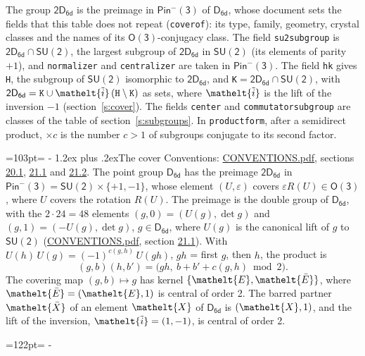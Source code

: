 \documentclass[10pt,a4paper]{article}
\makeatletter
\renewcommand\section{\@startsection{section}{1}{\z@}{-3ex plus -1ex minus -.2ex}%
  {1.2ex plus .2ex}{\normalfont\large\sffamily\bfseries\color{parttitle}}}
\newcommand{\needspace}[1]{\par\penalty-100\begingroup\dimen0=#1\relax\dimen2=\pagegoal
  \advance\dimen2-\pagetotal\ifdim\dimen0>\dimen2\relax\ifdim\dimen2>0pt\vfil\break\fi\fi
  \endgroup}
\numberwithin{equation}{section}
\newcommand{\eltfont}[1]{{\let\sigma\eltsigma\mathelt{#1}}}
\newcommand{\grp}[1]{\mathsf{#1}}
\newcommand{\elt}[1]{\eltfont{#1}}
\newcommand{\dirprod}{\times}
\newcommand{\barred}[1]{\bar{#1}}
\newcommand{\lift}[1]{\tilde{#1}}
\makeatother
\begin{document}
\leavevmode\label{n:element.inversion}\label{n:group.preimage}The group $\grp{2D_{6d}}$ is the preimage in $\grp{Pin^{-}(3)}$ of \href{../../../rotation/data/pdf/D6d.pdf}{$\grp{D_{6d}}$}, whose document sets the fields that this table does not repeat (\texttt{coverof}): its type, family, geometry, crystal classes and the names of its \href{../../../rotation/data/pdf/O3.pdf}{$\grp{O(3)}$}-conjugacy class. The field \texttt{su2subgroup} is $\grp{2D_{6d}} \cap \grp{SU(2)}$, the largest subgroup of $\grp{2D_{6d}}$ in $\grp{SU(2)}$ (its elements of parity $+1$), and \texttt{normalizer} and \texttt{centralizer} are taken in $\grp{Pin^{-}(3)}$. The field \texttt{hk} gives \texttt{H}, the subgroup of $\grp{SU(2)}$ isomorphic to $\grp{2D_{6d}}$, and \texttt{K}${} = \grp{2D_{6d}} \cap \grp{SU(2)}$, with $\grp{2D_{6d}} = \texttt{K} \cup \elt{\lift{i}}\,(\texttt{H} \setminus \texttt{K})$ as sets, where $\elt{\lift{i}}$ is the lift of the inversion $-1$ (section~\ref{s:cover}). The fields \texttt{center} and \texttt{commutatorsubgroup} are classes of the table of section~\ref{s:subgroups}.
\leavevmode\label{n:index.conjugates.c}In \texttt{productform}, after a semidirect product, ${\times}c$ is the number $c > 1$ of subgroups conjugate to its second factor.
\needspace{103pt}
\section{The cover}\label{s:cover}
Conventions: \href{../../CONVENTIONS.pdf}{CONVENTIONS.pdf}, sections \href{../../CONVENTIONS.pdf\#conv.20.1}{20.1}, \href{../../CONVENTIONS.pdf\#conv.21.1}{21.1} and \href{../../CONVENTIONS.pdf\#conv.21.2}{21.2}.
\leavevmode\label{n:group.pin.minus}\label{n:group.su2}\label{n:local.pin.sign}\label{n:matrix.covered}\label{n:matrix.lift.su2}\label{n:index.bar}The point group $\grp{D_{6d}}$ has the preimage $\grp{2D_{6d}}$ in $\grp{Pin^{-}(3)} = \grp{SU(2)} \dirprod \{+1, -1\}$, whose element $(U, \varepsilon)$ covers $\varepsilon R(U) \in \grp{O(3)}$, where $U$ covers the rotation $R(U)$. The preimage is the double group of $\grp{D_{6d}}$, with the $2 \cdot 24 = 48$ elements $(g, 0) = (U(g), \det g)$ and $(g, 1) = (-U(g), \det g)$, $g \in \grp{D_{6d}}$, where $U(g)$ is the canonical lift of $g$ to $\grp{SU(2)}$ (\href{../../CONVENTIONS.pdf}{CONVENTIONS.pdf}, section \href{../../CONVENTIONS.pdf\#conv.21.1}{21.1}). \label{n:function.cocycle}With $U(h)\,U(g) = (-1)^{c(g,h)}\,U(gh)$, $gh$ = first $g$, then $h$, the product is
\begin{equation}\label{e:product}(g, b)(h, b') = \bigl(gh,\ b + b' + c(g, h) \bmod 2\bigr).\end{equation}
\leavevmode\label{n:mark.bar}The covering map $(g, b) \mapsto g$ has kernel $\{\elt{E}, \elt{\barred{E}}\}$, where $\elt{\barred{E}} = (\elt{E}, 1)$ is central of order 2. \label{n:element.named}\label{n:mark.lift}The barred partner $\elt{\barred{X}}$ of an element $\elt{X}$ of $\grp{D_{6d}}$ is $(\elt{X}, 1)$, and the lift of the inversion, $\elt{\lift{i}} = (1, -1)$, is central of order 2.
\needspace{122pt}
\end{document}
